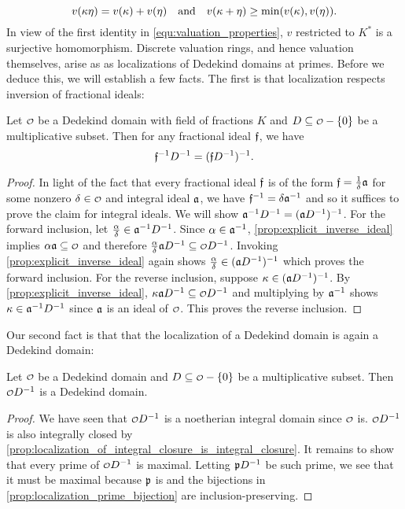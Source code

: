     \begin{equation}\label{equ:valuation_properties}
      v(\kappa\eta) = v(\kappa)+v(\eta) \quad \text{and} \quad v(\kappa+\eta) \ge \min(v(\kappa),v(\eta)).
    \end{equation}
    In view of the first identity in \cref{equ:valuation_properties}, $v$ restricted to $K^{\ast}$ is a surjective homomorphism. Discrete valuation rings, and hence valuation themselves, arise as as localizations of Dedekind domains at primes. Before we deduce this, we will establish a few facts. The first is that localization respects inversion of fractional ideals:
    
    \begin{proposition}\label{prop:localization_of_inverse_is_inverse_of_localization}
      Let $\smc{O}$ be a Dedekind domain with field of fractions $K$ and $D \subseteq \smc{O}-\{0\}$ be a multiplicative subset. Then for any fractional ideal $\mathfrak{f}$, we have
      \[
        \mathfrak{f}^{-1}D^{-1} = (\mathfrak{f}D^{-1})^{-1}.
      \]
    \end{proposition}
    \begin{proof}
      In light of the fact that every fractional ideal $\mathfrak{f}$ is of the form $\mathfrak{f} = \frac{1}{\delta}\mathfrak{a}$ for some nonzero $\d \in \smc{O}$ and integral ideal $\mathfrak{a}$, we have $\mathfrak{f}^{-1} = \delta\mathfrak{a}^{-1}$ and so it suffices to prove the claim for integral ideals. We will show $\mathfrak{a}^{-1}D^{-1} = (\mathfrak{a}D^{-1})^{-1}$. For the forward inclusion, let $\frac{\alpha}{\delta} \in \mathfrak{a}^{-1}D^{-1}$. Since $\alpha \in \mathfrak{a}^{-1}$, \cref{prop:explicit_inverse_ideal} implies $\a\mf{a} \subseteq \smc{O}$ and therefore $\frac{\a}{\d}\mf{a}D^{-1} \subseteq \smc{O}D^{-1}$. Invoking \cref{prop:explicit_inverse_ideal} again shows $\frac{\alpha}{\delta} \in (\mathfrak{a}D^{-1})^{-1}$ which proves the forward inclusion. For the reverse inclusion, suppose $\kappa \in (\mathfrak{a}D^{-1})^{-1}$. By \cref{prop:explicit_inverse_ideal}, $\k\mf{a}D^{-1} \subseteq \smc{O}D^{-1}$ and multiplying by $\mathfrak{a}^{-1}$ shows $\kappa \in \mathfrak{a}^{-1}D^{-1}$ since $\mathfrak{a}$ is an ideal of $\smc{O}$. This proves the reverse inclusion.
    \end{proof}

    Our second fact is that that the localization of a Dedekind domain is again a Dedekind domain:

    \begin{proposition}\label{prop:localization_of_Dedekind_is_Dedekind}
      Let $\smc{O}$ be a Dedekind domain and $D \subseteq \smc{O}-\{0\}$ be a multiplicative subset. Then $\smc{O}D^{-1}$ is a Dedekind domain.
    \end{proposition}
    \begin{proof}
      We have seen that $\smc{O}D^{-1}$ is a noetherian integral domain since $\smc{O}$ is. $\smc{O}D^{-1}$ is also integrally closed by \cref{prop:localization_of_integral_closure_is_integral_closure}. It remains to show that every prime of $\smc{O}D^{-1}$ is maximal. Letting $\mathfrak{p}D^{-1}$ be such prime, we see that it must be maximal because $\mathfrak{p}$ is and the bijections in \cref{prop:localization_prime_bijection} are inclusion-preserving.
    \end{proof}

